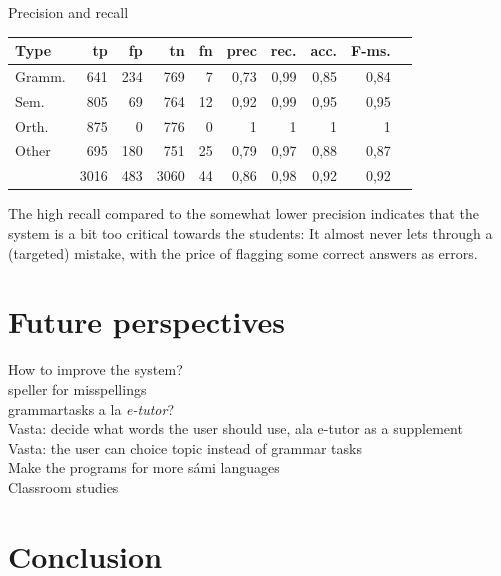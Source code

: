 \documentclass[11pt]{article}
\begin{document}
Precision and recall
\begin{table}%
\begin{tabular}{|l|r|r|r|r||r|r|r|r|r|}
\hline
Type	& tp		& fp		& tn		& fn	& prec	 & rec.	& acc.	& F-ms. \\
\hline
Gramm.    &   641   &   234   &   769    &   7    &   0,73   &   0,99   &   0,85   &   0,84	  \\
Sem.       &   805   &   69    &   764    &   12   &   0,92   &   0,99   &   0,95   &   0,95		  \\
Orth.      &   875   &   0     &   776    &   0    &   1      &   1      &   1      &   1					  \\
Other      &   695   &   180   &   751    &   25   &   0,79   &   0,97   &   0,88   &   0,87	  \\
\hline
  &   3016  &   483   &   3060   &   44   &   0,86   &   0,98   &   0,92   &   0,92			  \\
\hline
\end{tabular}
\end{table}%

The high recall compared to the somewhat lower precision indicates that the system is a bit too critical towards the students:
It almost never lets through a (targeted) mistake, with the price of flagging some correct answers as errors.
 
 

\section{Future perspectives}
How to improve the system? \\
speller for misspellings  \\
grammartasks a la \textit{e-tutor}? \\
Vasta: decide what words the user should use, ala e-tutor as a supplement \\
Vasta: the user can choice topic instead of grammar tasks \\
Make the programs for more sámi languages \\
Classroom studies \\

\section{Conclusion}
\end{document}
